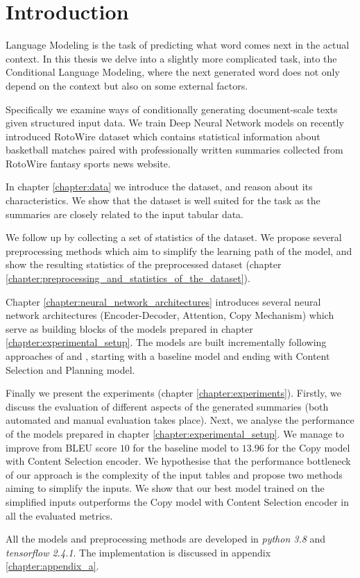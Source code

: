 \chapter*{Introduction} \label{chapter:introduction}

Language Modeling is the task of predicting what word comes next in the actual context. In this thesis we delve into a slightly more complicated task, into the Conditional Language Modeling, where the next generated word does not only depend on the context but also on some external factors.

Specifically we examine ways of conditionally generating document-scale texts given structured input data. We train Deep Neural Network models on recently introduced RotoWire dataset \citep{wiseman2017} which contains statistical information about basketball matches paired with professionally written summaries collected from RotoWire fantasy sports news website.

In chapter \ref{chapter:data} we introduce the dataset, and reason about its characteristics. We show that the dataset is well suited for the task as the summaries are closely related to the input tabular data.

We follow up by collecting a set of statistics of the dataset. We propose several preprocessing methods which aim to simplify the learning path of the model, and show the resulting statistics of the preprocessed dataset (chapter \ref{chapter:preprocessing_and_statistics_of_the_dataset}).

Chapter \ref{chapter:neural_network_architectures} introduces several neural network architectures (Encoder-Decoder, Attention, Copy Mechanism) which serve as building blocks of the models prepared in chapter \ref{chapter:experimental_setup}. The models are built incrementally following approaches of \citet{wiseman2017} and \citet{puduppully2019datatotext}, starting with a baseline model and ending with Content Selection and Planning model.

Finally we present the experiments (chapter \ref{chapter:experiments}). Firstly, we discuss the evaluation of different aspects of the generated summaries (both automated and manual evaluation takes place). Next, we analyse the performance of the models prepared in chapter \ref{chapter:experimental_setup}. We manage to improve from BLEU score $10$ for the baseline model to $13.96$ for the Copy model with Content Selection encoder. We hypothesise that the performance bottleneck of our approach is the complexity of the input tables and propose two methods aiming to simplify the inputs. We show that our best model trained on the simplified inputs outperforms the Copy model with Content Selection encoder in all the evaluated metrics.

All the models and preprocessing methods are developed in \emph{python 3.8} and \emph{tensorflow 2.4.1}. The implementation is discussed in appendix \ref{chapter:appendix_a}.